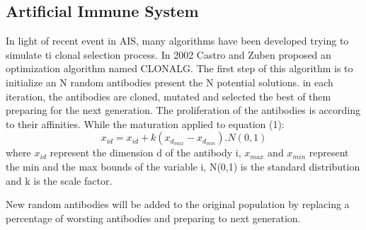 \documentclass[]{interact}
\theoremstyle{plain}%
\theoremstyle{definition}
\theoremstyle{remark}
\begin{document}
\subsection{Artificial Immune System}
In light of recent event in AIS, many algorithms have been developed trying to simulate ti clonal selection process. In 2002 Castro and Zuben proposed an optimization algorithm named CLONALG. The first step of this algorithm is to initialize an N random antibodies present the N potential solutions. in each iteration, the antibodies are cloned, mutated and selected the best of them preparing for the next generation. The proliferation of the antibodies is according to their affinities. While the maturation applied to equation (1): 
\begin{equation}
x_{id} = x_{id} + k(x_{d_{max}} - x_{d_{min}}) . N(0,1)
\end{equation}
where $x_{id}$ represent the dimension d of the antibody i, $x_{max}$ and $x_{min}$ represent the min and the max bounds of the variable i, N(0,1) is the standard distribution and k is the scale factor.

New random antibodies will be added to the original population by replacing a percentage of worsting antibodies and preparing to next generation.
\end{document}
